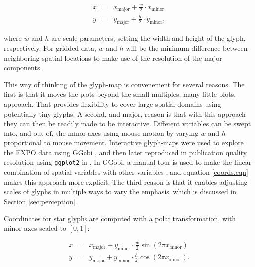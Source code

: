 \documentclass[oneside]{article}
\newcommand\amin{\text{minor}}
\newcommand\amaj{\text{major}}
\begin{document}
\begin{equation}
  \begin{array}{lll}
  x &=& x_{\amaj} + \frac{w}{2} \cdot x_{\amin}\\
  y &=& y_{\amaj} + \frac{h}{2} \cdot y_{\amin}, 
  \end{array}
  \label{coords.eqn}
\end{equation}

\noindent where $w$ and $h$ are scale parameters, setting the width and height of the glyph, respectively. For gridded data, $w$ and $h$ will be the minimum difference between neighboring spatial locations to make use of the resolution of the major components. 

This way of thinking of the glyph-map is convenenient for several reasons. The first is that it moves the plots beyond the small multiples, many little plots, approach. That provides flexibility to cover large spatial domains using potentially tiny glyphs. A second, and major, reason is that with this approach they can then be readily made to be interactive. Different variables can be swept into, and out of, the minor axes using mouse motion by varying $w$ and $h$ proportional to mouse movement. Interactive glyph-maps were used to explore the EXPO data using  GGobi \citep{swayne:2003}, and then later reproduced in publication quality resolution using {\tt ggplot2} \citep{me:ggplot2} in \citet{hobbs:2010}. In GGobi, a manual tour is used to make the linear combination of spatial variables with other variables \citep{CB95}, and equation \ref{coords.eqn} makes this approach more explicit. The third reason is that it enables adjusting scales of glyphs in multiple ways to vary the emphasis, which is discussed in Section \ref{sec:perception}.


Coordinates for star glyphs are computed with a polar transformation, with minor axes scaled to $[0, 1]$: 

\begin{equation}
  \begin{array}{lll}
  x &=& x_{\amaj} + y_{\amin} \cdot \frac{w}{2} \sin(2 \pi x_{\amin}) \\
  y &=& y_{\amaj} + y_{\amin} \cdot \frac{h}{2} \cos(2 \pi x_{\amin}).
  \end{array}
  \label{coords.polar.eqn}
\end{equation}
\end{document}
